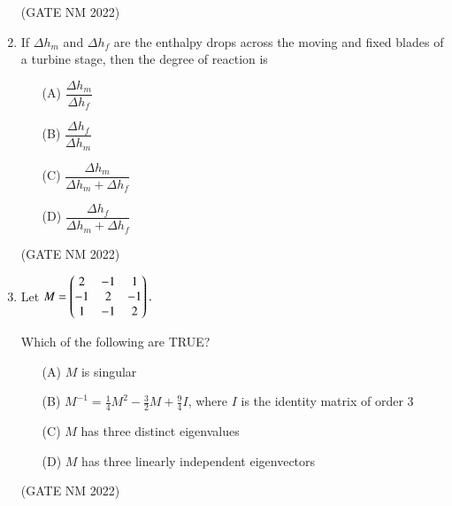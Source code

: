 \documentclass[journal,12pt,onecolumn]{IEEEtran}
\theoremstyle{remark}
\begin{document}
\begin{enumerate}
\begin{multicols}{4}
\end{multicols}

\hfill(GATE NM 2022)











\item  If $\Delta h_m$ and $\Delta h_f$ are the enthalpy drops across the moving and fixed blades of a turbine stage, then the degree of reaction is

	\begin{multicols}{4}

\begin{enumerate}
    \item[(A)] $\dfrac{\Delta h_m}{ \Delta h_f}$
    \item[(B)] $\dfrac{\Delta h_f}{\Delta h_m }$
    \item[(C)] $\dfrac{\Delta h_m }{\Delta h_m + \Delta h_f}$
    \item[(D)] $\dfrac{\Delta h_f }{\Delta h_m + \Delta h_f}$
\end{enumerate}

	\end{multicols}

\hfill(GATE NM 2022)



\item  Let  
$M=
\begin{pmatrix}2 & -1 & 1 \\
-1 & 2 & -1 \\
1 & -1 & 2\end{pmatrix}.
$  

Which of the following are TRUE?

\begin{enumerate}
    \item[(A)] $M$ is singular
    \item[(B)] $M^{-1} = {\frac{1}{4}}M^{2} - {\frac{3}{2}}M + {\frac{9}{4}}I $, where $I$ is the identity matrix of order 3
    \item[(C)] $M$ has three distinct eigenvalues
    \item[(D)] $M$ has three linearly independent eigenvectors
\end{enumerate}

\hfill(GATE NM 2022)













\end{enumerate}
\end{document}
